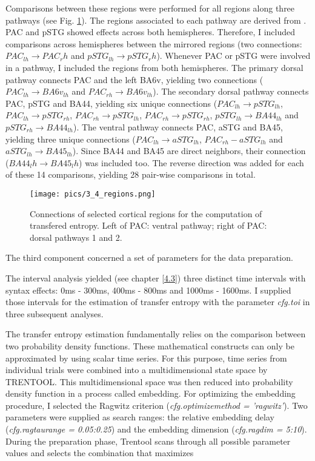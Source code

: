 Comparisons between these regions were performed for all regions along three pathways (see Fig. \ref{3.4.regions}).
The regions associated to each pathway are derived from \cite{1.1.pathways}.
PAC and pSTG showed effects across both hemispheres.
Therefore, I included comparisons across hemispheres between the mirrored regions (two connections: $PAC_{lh} \rightarrow PAC_rh$ and $pSTG_{lh} \rightarrow pSTG_rh$).
Whenever PAC or pSTG were involved in a pathway, I included the regions from both hemispheres.
The primary dorsal pathway connects PAC and the left BA6v, yielding two connections ($PAC_{lh} \rightarrow BA6v_{lh}$ and $PAC_{rh} \rightarrow BA6v_{lh}$).
The secondary dorsal pathway connects PAC, pSTG and BA44, yielding six unique connections ($PAC_{lh} \rightarrow pSTG_{lh}$, $PAC_{lh} \rightarrow pSTG_{rh}$, $PAC_{rh} \rightarrow pSTG_{lh}$, $PAC_{rh} \rightarrow pSTG_{rh}$, $pSTG_{lh} \rightarrow BA44_{lh}$ and $pSTG_{rh} \rightarrow BA44_{lh}$).
The ventral pathway connects PAC, aSTG and BA45, yielding three unique connections ($PAC_{lh} \rightarrow aSTG_{lh}$, $PAC_{rh}-aSTG_{lh}$ and $aSTG_{lh} \rightarrow BA45_{lh}$).
Since BA44 and BA45 are direct neighbors, their connection ($BA44_lh \rightarrow BA45_lh$) was included too.
The reverse direction was added for each of these 14 comparisons, yielding 28 pair-wise comparisons in total.

\begin{figure}[h]
\begin{center}
\vspace{7mm}
\texttt{[image: pics/3\_4\_regions.png]}
\caption{\label{3.4.regions} Connections of selected cortical regions for the computation of transfered entropy. Left of PAC: ventral pathway; right of PAC: dorsal pathways 1 and 2.}
\end{center}
\end{figure}

The third component concerned a set of parameters for the data preparation.

The interval analysis yielded (see chapter \ref{4.3}) three distinct time intervals with syntax effects: 0ms - 300ms, 400ms - 800ms and 1000ms - 1600ms.
I supplied those intervals for the estimation of transfer entropy with the parameter \emph{cfg.toi} in three subsequent analyses.

The transfer entropy estimation fundamentally relies on the comparison between two probability density functions.
These mathematical constructs can only be approximated by using scalar time series.
For this purpose, time series from individual trials were combined into a multidimensional state space by TRENTOOL.
This multidimensional space was then reduced into probability density function in a process called embedding.
For optimizing the embedding procedure, I selected the Ragwitz criterion (\emph{cfg.optimizemethod = 'ragwitz'}).
Two parameters were supplied as search ranges: the relative embedding delay (\emph{cfg.ragtaurange = 0.05:0.25}) and the embedding dimension (\emph{cfg.ragdim = 5:10}).
During the preparation phase, Trentool scans through all possible parameter values and selects the combination that maximizes 

